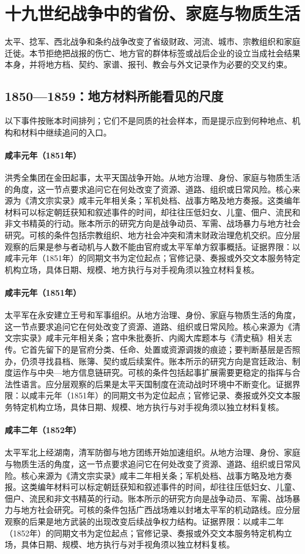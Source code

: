 \section{十九世纪战争中的省份、家庭与物质生活}
太平、捻军、西北战争和条约战争改变了省级财政、河流、城市、宗教组织和家庭迁徙。本节拒绝把战报的伤亡、地方官的群体标签或战后企业的设立当成社会结果本身，并将地方档、契约、家谱、报刊、教会与外文记录作为必要的交叉约束。
\subsection{1850—1859：地方材料所能看见的尺度}
以下事件按账本时间排列；它们不是同质的社会样本，而是提示应到何种地点、机构和材料中继续追问的入口。
\hypertarget{social:EQ-1851-JINTIAN-UPRISING}{}\paragraph{咸丰元年（1851年）}洪秀全集团在金田起事，太平天国战争开始。从地方治理、身份、家庭与物质生活的角度，这一节点要求追问它在何处改变了资源、道路、组织或日常风险。核心来源为《清文宗实录》咸丰元年相关条；军机处档、战事方略及地方奏报。这类编年材料可以标定朝廷获知和叙述事件的时间，却往往压低妇女、儿童、佃户、流民和非文书精英的行动。账本所示的研究方向是战争动员、军需、战场暴力与地方社会研究。可核的条件包括宗教组织、地方社会冲突和清末财政治理危机交织。应分层观察的后果是参与者动机与人数不能由官府或太平军单方叙事概括。证据界限：以咸丰元年（1851年）的同期文书为定位起点；官修记录、奏报或外交文本服务特定机构立场，具体日期、规模、地方执行与对手视角须以独立材料复核。
\hypertarget{social:EQ-1851-YONGAN-KINGSHIPS}{}\paragraph{咸丰元年（1851年）}太平军在永安建立王号和军事组织。从地方治理、身份、家庭与物质生活的角度，这一节点要求追问它在何处改变了资源、道路、组织或日常风险。核心来源为《清文宗实录》咸丰元年相关条；宫中朱批奏折、内阁大库题本与《清史稿》相关志传。它首先留下的是官府分类、任命、处置或资源调拨的痕迹；要判断基层是否照办，仍须寻找县档、账簿、契约或后续案件。账本所示的研究方向是宫廷政治、制度运作与中央—地方信息链研究。可核的条件包括起事扩展需要更稳定的指挥与合法性语言。应分层观察的后果是太平天国制度在流动战时环境中不断变化。证据界限：以咸丰元年（1851年）的同期文书为定位起点；官修记录、奏报或外交文本服务特定机构立场，具体日期、规模、地方执行与对手视角须以独立材料复核。
\hypertarget{social:EQ-1852-TAIPING-NORTHWARD-MARCH}{}\paragraph{咸丰二年（1852年）}太平军北上经湖南，清军防御与地方团练开始加速组织。从地方治理、身份、家庭与物质生活的角度，这一节点要求追问它在何处改变了资源、道路、组织或日常风险。核心来源为《清文宗实录》咸丰二年相关条；军机处档、战事方略及地方奏报。这类编年材料可以标定朝廷获知和叙述事件的时间，却往往压低妇女、儿童、佃户、流民和非文书精英的行动。账本所示的研究方向是战争动员、军需、战场暴力与地方社会研究。可核的条件包括广西战场难以封堵太平军的机动路线。应分层观察的后果是地方武装的出现改变后续战争权力结构。证据界限：以咸丰二年（1852年）的同期文书为定位起点；官修记录、奏报或外交文本服务特定机构立场，具体日期、规模、地方执行与对手视角须以独立材料复核。
